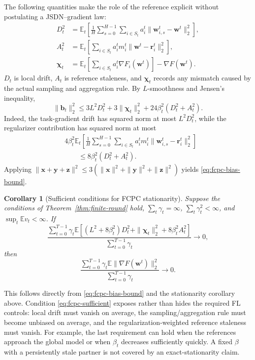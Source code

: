 \documentclass[journal,twoside,web]{ieeecolor}
\newtheorem{corollary}{Corollary}
\begin{document}
The following quantities make the role of the reference explicit without
postulating a JSDN--gradient law:
\begin{align}
 D_t^2
 &=\mathbb E_t\left[\frac1H\sum_{s=0}^{H-1}
 \sum_{i\in S_t}a_i^t\|\bm w_{i,s}^{t}-\bm w^t\|_2^2\right],\\
 A_t^2
 &=\mathbb E_t\left[\sum_{i\in S_t}a_i^t
 m_i^t\|\bm w^t-\bm r_i^t\|_2^2\right],\\
 \bm\chi_t
 &=\mathbb E_t\left[\sum_{i\in S_t}a_i^t
 \nabla F_i(\bm w^t)\right]-\nabla F(\bm w^t).
\end{align}
$D_t$ is local drift, $A_t$ is reference staleness, and $\bm\chi_t$ records
any mismatch caused by the actual sampling and aggregation rule. By
$L$-smoothness and Jensen's inequality,
\begin{equation}
 \|\bm b_t\|_2^2
 \leq3L^2D_t^2+3\|\bm\chi_t\|_2^2
 +24\beta_t^2(D_t^2+A_t^2).                             \label{eq:fcpc-bias-bound}
\end{equation}
Indeed, the task-gradient drift has squared norm at most $L^2D_t^2$, while
the regularizer contribution has squared norm at most
\begin{align}
 &4\beta_t^2\mathbb E_t\left[\frac1H\sum_{s=0}^{H-1}
 \sum_{i\in S_t}a_i^tm_i^t
 \|\bm w_{i,s}^{t}-\bm r_i^t\|_2^2\right]\\
 &\qquad\leq8\beta_t^2(D_t^2+A_t^2).
\end{align}
Applying $\|\bm x+\bm y+\bm z\|^2\leq
3(\|\bm x\|^2+\|\bm y\|^2+\|\bm z\|^2)$ yields
\eqref{eq:fcpc-bias-bound}.

\begin{corollary}[Sufficient conditions for FCPC stationarity]
Suppose the conditions of Theorem~\ref{thm:finite-round} hold,
$\sum_t\gamma_t=\infty$, $\sum_t\gamma_t^2<\infty$, and
$\sup_t\mathbb E v_t<\infty$. If
\begin{equation}
 \frac{\sum_{t=0}^{T-1}\gamma_t\mathbb E\!\left[
 (L^2+8\beta_t^2)D_t^2+\|\bm\chi_t\|_2^2
 +8\beta_t^2A_t^2\right]}
 {\sum_{t=0}^{T-1}\gamma_t}\longrightarrow0,            \label{eq:fcpc-sufficient}
\end{equation}
then
\begin{equation}
 \frac{\sum_{t=0}^{T-1}\gamma_t
 \mathbb E\|\nabla F(\bm w^t)\|_2^2}
 {\sum_{t=0}^{T-1}\gamma_t}\longrightarrow0.
\end{equation}
\end{corollary}

This follows directly from \eqref{eq:fcpc-bias-bound} and the stationarity
corollary above. Condition \eqref{eq:fcpc-sufficient} exposes rather than
hides the required FL controls: local drift must vanish on average, the
sampling/aggregation rule must become unbiased on average, and the
regularization-weighted reference staleness must vanish. For example, the
last requirement can hold when the references approach the global model or
when $\beta_t$ decreases sufficiently quickly. A fixed $\beta$ with a
persistently stale partner is not covered by an exact-stationarity claim.
\end{document}
